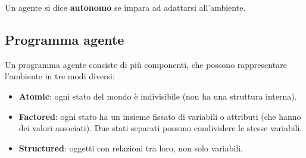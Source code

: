 Un agente si dice \textbf{autonomo} se impara ad adattarsi all'ambiente.

\subsection{Programma agente}

Un programma agente consiste di più componenti, che possono rappresentare
l'ambiente in tre modi diversi:

\begin{itemize}
 \item \textbf{Atomic}: ogni stato del mondo è indivisibile (non ha una
struttura interna).
 \item \textbf{Factored}: ogni stato ha un insieme fissato di variabili o
attributi (che hanno dei valori associati).
Due stati separati possono condividere le stesse variabili.
 \item \textbf{Structured}: oggetti con relazioni tra loro, non solo
variabili.
\end{itemize}
